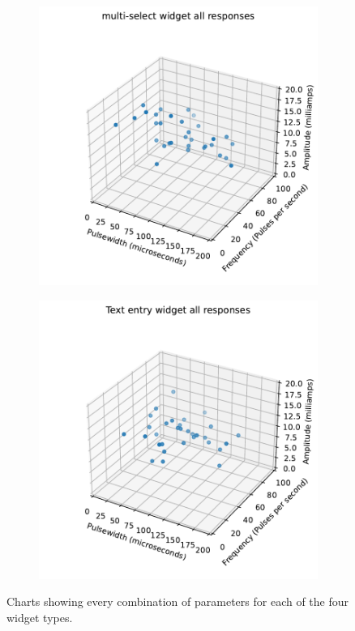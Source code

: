 \documentclass{mpaper}
\begin{document}
\begin{figure}
\begin{subfigure}{0.22\textwidth}
    \end{subfigure} \hfill
    \begin{subfigure}{0.22\textwidth}
        \includegraphics[width=\textwidth]{images/20240321-134134.pdf}
    \end{subfigure} \hfill
    \begin{subfigure}{0.22\textwidth}
        \includegraphics[width=\textwidth]{images/20240321-134214.pdf}
    \end{subfigure} \hfill
    \caption{Charts showing every combination of parameters for each of the four widget types.}
    \label{fig:widget-clusters}
\end{figure}
\end{document}
